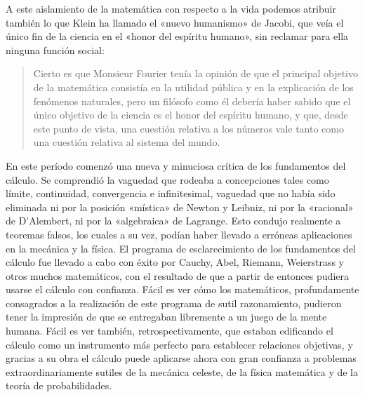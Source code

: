 \documentclass[a4paper, 12pt]{article}
\begin{document}
{{A este aislamiento de la matemática con respecto a la vida podemos atribuir
también lo que Klein ha llamado el «nuevo humanismo»  de Jacobi, que veía el
único fin de la ciencia en el «honor del espíritu humano», sin reclamar para
ella ninguna función social:

\begin{quote}\small Cierto es que Monsieur Fourier tenía la opinión de que el
principal objetivo de la matemática consistía en la utilidad pública y en la
explicación de los fenómenos naturales, pero un filósofo como él debería haber
sabido que el único objetivo de la ciencia es el honor del espíritu humano, y
que, desde este punto de vista, una cuestión relativa a los números vale tanto
como una cuestión relativa al sistema del mundo. \end{quote}

En este período comenzó una nueva y minuciosa crítica de los fundamentos del
cálculo. Se comprendió la vaguedad que rodeaba a concepciones tales como límite,
continuidad, convergencia e infinitesimal, vaguedad que no había sido eliminada
ni por la posición «mística»  de Newton y Leibniz, ni por la «racional»  de
D'Alembert, ni por la «algebraica» de Lagrange. Esto condujo realmente a
teoremas falsos, los cuales a su vez, podían haber llevado a erróneas
aplicaciones en la mecánica y la física. El programa de esclarecimiento de los
fundamentos del cálculo fue llevado a cabo con éxito por Cauchy, Abel, Riemann,
Weierstrass y otros muchos matemáticos, con el resultado de que a partir de
entonces pudiera usarse el cálculo con confianza. Fácil es ver cómo los
matemáticos, profundamente consagrados a la realización de este programa de
sutil razonamiento, pudieron tener la impresión de que se entregaban libremente
a un juego de la mente humana. Fácil es ver también, retrospectivamente, que
estaban edificando el cálculo como un instrumento más perfecto para establecer
relaciones objetivas, y gracias a su obra el cálculo puede aplicarse ahora con
gran confianza a problemas extraordinariamente sutiles de la mecánica celeste,
de la física matemática y de la teoría de probabilidades.

}}
\end{document}
